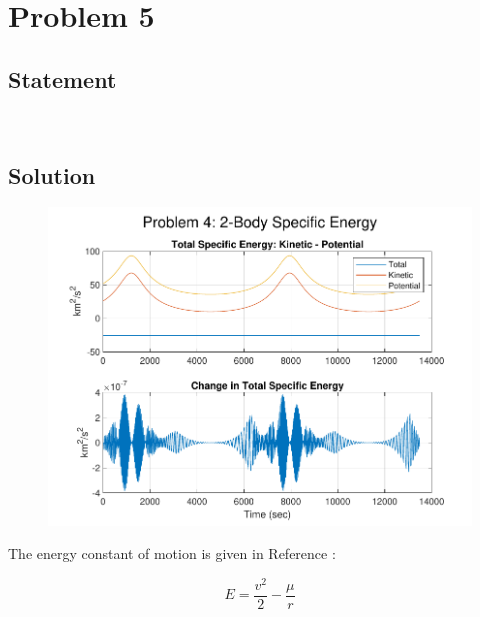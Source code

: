 \documentclass[conf]{new-aiaa}
\begin{document}
\section{Problem 5} 

\subsection{Statement} 
\begin{center}
	 \\
\end{center}

\subsection{Solution} 

\begin{figure}[H]
	\centering
	\includegraphics{prob5_energy.pdf}
	\caption{}
	\label{fig:prob5_energy}
\end{figure}

The energy constant of motion is given in Reference \cite{bate_astrodynamics}: 

\begin{equation}
E = \dfrac{v^2}{2} - \dfrac{\mu}{r}
\end{equation}
\end{document}
